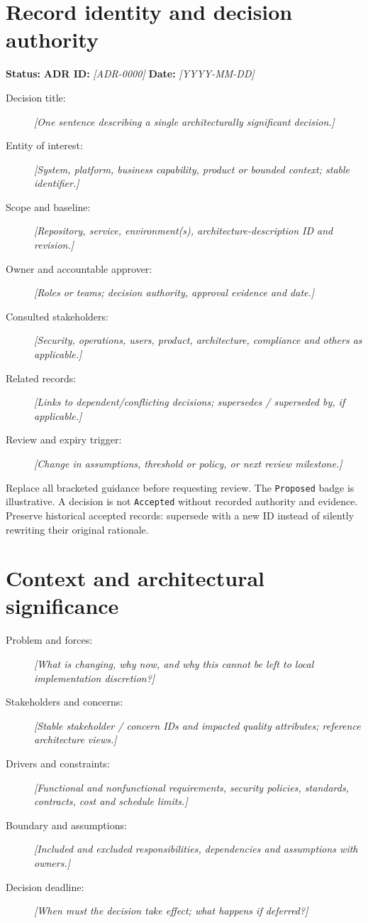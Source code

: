 \documentclass[11pt,letterpaper]{article}
\begin{document}
\makedoctocpage


\section{Record identity and decision authority}
\noindent\textbf{Status:} \quad
\textbf{ADR ID:} \emph{[ADR-0000]}\quad
\textbf{Date:} \emph{[YYYY-MM-DD]}

\begin{description}
\item[Decision title:] \emph{[One sentence describing a single architecturally significant decision.]}
\item[Entity of interest:] \emph{[System, platform, business capability, product or bounded context; stable identifier.]}
\item[Scope and baseline:] \emph{[Repository, service, environment(s), architecture-description ID and revision.]}
\item[Owner and accountable approver:] \emph{[Roles or teams; decision authority, approval evidence and date.]}
\item[Consulted stakeholders:] \emph{[Security, operations, users, product, architecture, compliance and others as applicable.]}
\item[Related records:] \emph{[Links to dependent/conflicting decisions; supersedes / superseded by, if applicable.]}
\item[Review and expiry trigger:] \emph{[Change in assumptions, threshold or policy, or next review milestone.]}
\end{description}

\begin{notebox}
Replace all bracketed guidance before requesting review. The \texttt{Proposed}
badge is illustrative. A decision is not \texttt{Accepted} without recorded
authority and evidence. Preserve historical accepted records: supersede with
a new ID instead of silently rewriting their original rationale.
\end{notebox}

\section{Context and architectural significance}
\begin{description}
\item[Problem and forces:] \emph{[What is changing, why now, and why this cannot be left to local implementation discretion?]}
\item[Stakeholders and concerns:] \emph{[Stable stakeholder / concern IDs and impacted quality attributes; reference architecture views.]}
\item[Drivers and constraints:] \emph{[Functional and nonfunctional requirements, security policies, standards, contracts, cost and schedule limits.]}
\item[Boundary and assumptions:] \emph{[Included and excluded responsibilities, dependencies and assumptions with owners.]}
\item[Decision deadline:] \emph{[When must the decision take effect; what happens if deferred?]}
\end{description}
\end{document}
